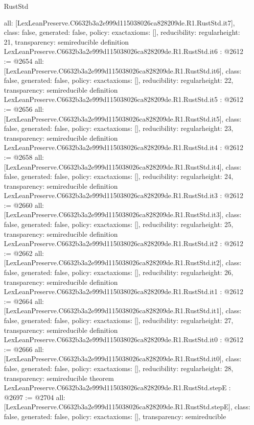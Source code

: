 \begin{lexlean}{RustStd}
\begin{coremodule}
{  all: [LexLeanPreserve.C6632b3a2e999d115038026ca828209de.R1.RustStd.it7],
  class: false,
  generated: false,
  policy: exact{axioms: []},
  reducibility: regular{height: 21},
  transparency: semireducible
}
definition LexLeanPreserve.C6632b3a2e999d115038026ca828209de.R1.RustStd.it6 : @2612 := @2654 {
  all: [LexLeanPreserve.C6632b3a2e999d115038026ca828209de.R1.RustStd.it6],
  class: false,
  generated: false,
  policy: exact{axioms: []},
  reducibility: regular{height: 22},
  transparency: semireducible
}
definition LexLeanPreserve.C6632b3a2e999d115038026ca828209de.R1.RustStd.it5 : @2612 := @2656 {
  all: [LexLeanPreserve.C6632b3a2e999d115038026ca828209de.R1.RustStd.it5],
  class: false,
  generated: false,
  policy: exact{axioms: []},
  reducibility: regular{height: 23},
  transparency: semireducible
}
definition LexLeanPreserve.C6632b3a2e999d115038026ca828209de.R1.RustStd.it4 : @2612 := @2658 {
  all: [LexLeanPreserve.C6632b3a2e999d115038026ca828209de.R1.RustStd.it4],
  class: false,
  generated: false,
  policy: exact{axioms: []},
  reducibility: regular{height: 24},
  transparency: semireducible
}
definition LexLeanPreserve.C6632b3a2e999d115038026ca828209de.R1.RustStd.it3 : @2612 := @2660 {
  all: [LexLeanPreserve.C6632b3a2e999d115038026ca828209de.R1.RustStd.it3],
  class: false,
  generated: false,
  policy: exact{axioms: []},
  reducibility: regular{height: 25},
  transparency: semireducible
}
definition LexLeanPreserve.C6632b3a2e999d115038026ca828209de.R1.RustStd.it2 : @2612 := @2662 {
  all: [LexLeanPreserve.C6632b3a2e999d115038026ca828209de.R1.RustStd.it2],
  class: false,
  generated: false,
  policy: exact{axioms: []},
  reducibility: regular{height: 26},
  transparency: semireducible
}
definition LexLeanPreserve.C6632b3a2e999d115038026ca828209de.R1.RustStd.it1 : @2612 := @2664 {
  all: [LexLeanPreserve.C6632b3a2e999d115038026ca828209de.R1.RustStd.it1],
  class: false,
  generated: false,
  policy: exact{axioms: []},
  reducibility: regular{height: 27},
  transparency: semireducible
}
definition LexLeanPreserve.C6632b3a2e999d115038026ca828209de.R1.RustStd.it0 : @2612 := @2666 {
  all: [LexLeanPreserve.C6632b3a2e999d115038026ca828209de.R1.RustStd.it0],
  class: false,
  generated: false,
  policy: exact{axioms: []},
  reducibility: regular{height: 28},
  transparency: semireducible
}
theorem LexLeanPreserve.C6632b3a2e999d115038026ca828209de.R1.RustStd.stepE : @2697 := @2704 {
  all: [LexLeanPreserve.C6632b3a2e999d115038026ca828209de.R1.RustStd.stepE],
  class: false,
  generated: false,
  policy: exact{axioms: []},
  transparency: semireducible
}
\end{coremodule}
\end{lexlean}
